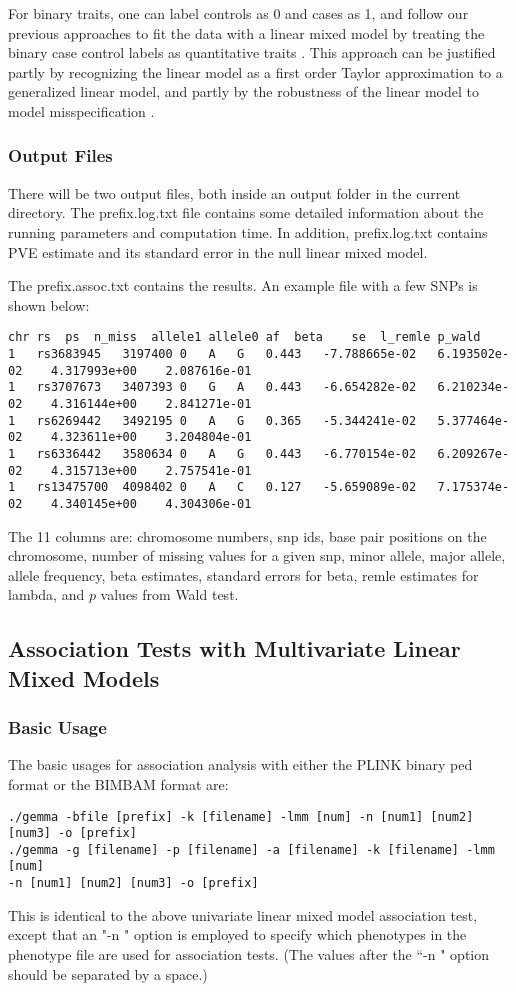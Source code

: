 \documentclass[11pt]{article}
\begin{document}
For binary traits, one can label controls as 0 and cases as 1, and follow our previous approaches to fit the data with a linear mixed model by treating the binary case control labels as quantitative traits \cite{Zhou:2012, Zhou:2013}. This approach can be justified partly by recognizing the linear model as a first order Taylor approximation to a generalized linear model, and partly by the robustness of the linear model to model misspecification \cite{Zhou:2013}.


\subsubsection{Output Files}
There will be two output files, both inside an output folder in the current directory. The prefix.log.txt file contains some detailed information about the running parameters and computation time. In addition, prefix.log.txt contains PVE estimate and its standard error in the null linear mixed model.

The prefix.assoc.txt contains the results. An example file with a few SNPs is shown below:
%
\begin{verbatim}
chr	rs	ps	n_miss	allele1	allele0	af	beta	se	l_remle	p_wald
1	rs3683945	3197400	0	A	G	0.443	-7.788665e-02	6.193502e-02	4.317993e+00	2.087616e-01
1	rs3707673	3407393	0	G	A	0.443	-6.654282e-02	6.210234e-02	4.316144e+00	2.841271e-01
1	rs6269442	3492195	0	A	G	0.365	-5.344241e-02	5.377464e-02	4.323611e+00	3.204804e-01
1	rs6336442	3580634	0	A	G	0.443	-6.770154e-02	6.209267e-02	4.315713e+00	2.757541e-01
1	rs13475700	4098402	0	A	C	0.127	-5.659089e-02	7.175374e-02	4.340145e+00	4.304306e-01
\end{verbatim}
%

The 11 columns are: chromosome numbers, snp ids, base pair positions on the chromosome, number of missing values for a given snp, minor allele, major allele, allele frequency, beta estimates, standard errors for beta, remle estimates for lambda, and $p$ values from Wald test. 


\subsection{Association Tests with Multivariate Linear Mixed Models}
\subsubsection{Basic Usage}
The basic usages for association analysis with either the PLINK binary ped format or the BIMBAM format are:
\begin{verbatim}
./gemma -bfile [prefix] -k [filename] -lmm [num] -n [num1] [num2] [num3] -o [prefix]
./gemma -g [filename] -p [filename] -a [filename] -k [filename] -lmm [num] 
-n [num1] [num2] [num3] -o [prefix]
\end{verbatim}
This is identical to the above univariate linear mixed model association test, except that an "-n " option is employed to specify which phenotypes in the phenotype file are used for association tests.  (The values after the ``-n " option should be separated by a space.) 
\end{document}
